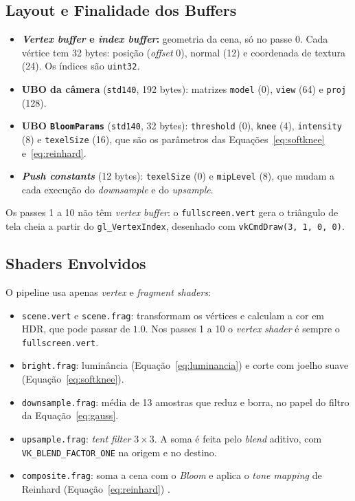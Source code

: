 \subsection{Layout e Finalidade dos Buffers}
\begin{itemize}
    \setlength{\itemsep}{0pt}
    \item \textbf{\textit{Vertex buffer} e \textit{index buffer}:} geometria da cena, só no passe 0. Cada vértice tem 32 bytes: posição (\textit{offset} 0), normal (12) e coordenada de textura (24). Os índices são \texttt{uint32}.
    \item \textbf{UBO da câmera} (\texttt{std140}, 192 bytes): matrizes \texttt{model} (0), \texttt{view} (64) e \texttt{proj} (128).
    \item \textbf{UBO \texttt{BloomParams}} (\texttt{std140}, 32 bytes): \texttt{threshold} (0), \texttt{knee} (4), \texttt{intensity} (8) e \texttt{texelSize} (16), que são os parâmetros das Equações~\ref{eq:softknee} e~\ref{eq:reinhard}.
    \item \textbf{\textit{Push constants}} (12 bytes): \texttt{texelSize} (0) e \texttt{mipLevel} (8), que mudam a cada execução do \textit{downsample} e do \textit{upsample}.
\end{itemize}
Os passes 1 a 10 não têm \textit{vertex buffer}: o \texttt{fullscreen.vert} gera o triângulo de tela cheia a partir do \texttt{gl\_VertexIndex}, desenhado com \texttt{vkCmdDraw(3, 1, 0, 0)}.

\subsection{Shaders Envolvidos}
O pipeline usa apenas \textit{vertex} e \textit{fragment shaders}:
\begin{itemize}
    \setlength{\itemsep}{0pt}
    \item \texttt{scene.vert} e \texttt{scene.frag}: transformam os vértices e calculam a cor em HDR, que pode passar de $1.0$. Nos passes 1 a 10 o \textit{vertex shader} é sempre o \texttt{fullscreen.vert}.
    \item \texttt{bright.frag}: luminância (Equação~\ref{eq:luminancia}) e corte com joelho suave (Equação~\ref{eq:softknee}).
    \item \texttt{downsample.frag}: média de 13 amostras que reduz e borra, no papel do filtro da Equação~\ref{eq:gauss}.
    \item \texttt{upsample.frag}: \textit{tent filter} $3 \times 3$. A soma é feita pelo \textit{blend} aditivo, com \texttt{VK\_BLEND\_FACTOR\_ONE} na origem e no destino.
    \item \texttt{composite.frag}: soma a cena com o \textit{Bloom} e aplica o \textit{tone mapping} de Reinhard (Equação~\ref{eq:reinhard}) \cite{reinhard2002tone}.
\end{itemize}

